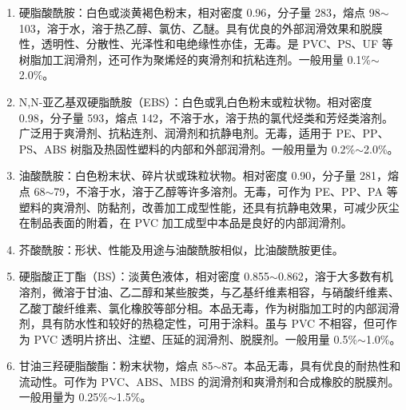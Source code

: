 \begin{enumerate}[(1) ]
    \item 硬脂酸酰胺：白色或淡黄褐色粉末，相对密度 0.96，分子量 283，熔点 98$\sim$103\cd，溶于水，溶于热乙醇、氯仿、乙醚。具有优良的外部润滑效果和脱膜性，透明性、分散性、光泽性和电绝缘性亦佳，无毒。是 PVC、PS、UF 等树脂加工润滑剂，还可作为聚烯烃的爽滑剂和抗粘连剂。一般用量 0.1\%$\sim$2.0\%。
    \item N,N-亚乙基双硬脂酰胺（EBS）：白色或乳白色粉末或粒状物。相对密度 0.98，分子量 593，熔点 142\cd，不溶于水，溶于热的氯代烃类和芳烃类溶剂。广泛用于爽滑剂、抗粘连剂、润滑剂和抗静电剂。无毒，适用于 PE、PP、PS、ABS 树脂及热固性塑料的内部和外部润滑剂。一般用量为 0.2\%$\sim$2.0\%。
    \item 油酸酰胺：白色粉末状、碎片状或珠粒状物。相对密度 0.90，分子量 281，熔点 68$\sim$79\cd，不溶于水，溶于乙醇等许多溶剂。无毒，可作为 PE、PP、PA 等塑料的爽滑剂、防黏剂，改善加工成型性能，还具有抗静电效果，可减少灰尘在制品表面的附着，在 PVC 加工成型中本品是良好的内部润滑剂。
    \item 芥酸酰胺：形状、性能及用途与油酸酰胺相似，比油酸酰胺更佳。
    \item 硬脂酸正丁酯（BS）：淡黄色液体，相对密度 0.855$\sim$0.862，溶于大多数有机溶剂，微溶于甘油、乙二醇和某些胺类，与乙基纤维素相容，与硝酸纤维素、乙酸丁酸纤维素、氯化橡胶等部分相。本品无毒，作为树脂加工时的内部润滑剂，具有防水性和较好的热稳定性，可用于涂料。虽与 PVC 不相容，但可作为 PVC 透明片挤出、注塑、压延的润滑剂、脱膜剂。一般用量 0.5\%$\sim$1.0\%。
    \item 甘油三羟硬脂酸酯：粉末状物，熔点 85$\sim$87\cd。本品无毒，具有优良的耐热性和流动性。可作为 PVC、ABS、MBS 的润滑剂和爽滑剂和合成橡胶的脱膜剂。一般用量为 0.25\%$\sim$1.5\%。
\end{enumerate}

